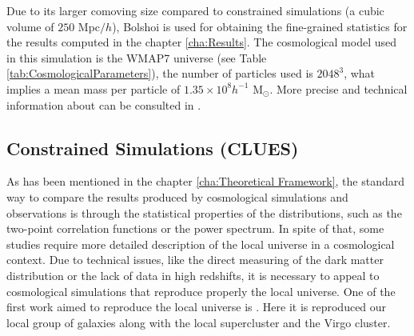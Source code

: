 Due to its larger comoving size compared to constrained simulations (a
cubic volume of $250$ Mpc$/h$), Bolshoi is used for obtaining the 
fine-grained statistics for the results computed in the chapter
\ref{cha:Results}. The cosmological model used in this simulation is the 
WMAP7 universe (see Table \ref{tab:CosmologicalParameters}), the number of
particles used is $2048^3$, what implies a mean mass per particle of 
$1.35 \times 10^8 h^{-1}$ M$_{\odot}$. More precise and technical 
information about can be consulted in \cite{klypin2011}.
\newpage



	\subsection{Constrained Simulations (CLUES)}
	\label{subsec:ConstrainedSimulations}


As has been mentioned in the chapter \ref{cha:Theoretical Framework}, the
standard way to compare the results produced by cosmological simulations 
and observations is through the statistical properties of the 
distributions, such as the two-point correlation functions or the power 
spectrum. In spite of that, some studies require more detailed description
of the local universe in a cosmological context. Due to technical issues, 
like the direct measuring of the dark matter distribution or the lack of 
data in high redshifts, it is necessary to appeal to cosmological 
simulations that reproduce properly the local universe. One of the first 
work aimed to reproduce the local universe is \cite{Klypin2003}. Here it 
is reproduced our local group of galaxies along with the local 
supercluster and the Virgo cluster.


